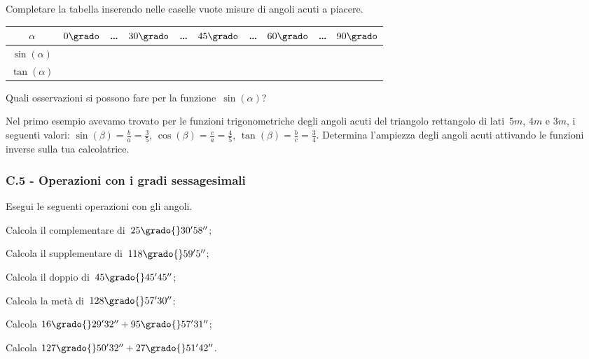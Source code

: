 \begin{esercizio}
\label{ese:C.4}
Completare la tabella inserendo nelle caselle vuote misure di angoli acuti a piacere.
\begin{center}
\begin{tabular}{cccccccccc}
\toprule
$\alpha$ & $0\grado$ & \ldots & $30\grado$ & \ldots & $45\grado$ & \ldots & $60\grado$ & \ldots & $90\grado$\\
\midrule
$\sin(\alpha)$ & & & & &  &  &  &  &  \\
$\tan(\alpha)$ & & &  &  &  &  &  &  &  \\
\bottomrule
\end{tabular}
\end{center}

Quali osservazioni si possono fare per la funzione~$\sin({\alpha})$?
\end{esercizio}

\begin{esercizio}
\label{ese:C.5}
Nel primo esempio avevamo trovato per le funzioni trigonometriche degli angoli acuti del triangolo rettangolo di lati~$5\unit{m}$,
$4\unit{m}$ e $3\unit{m}$, i seguenti valori:
$\sin(\beta)=\frac{b}{a}=\frac{3}{5}$, $\cos(\beta)=\frac{c}{a}=\frac{4}{5}$, $\tan(\beta)=\frac{b}{c}=\frac{3}{4}$.
Determina l'ampiezza degli angoli acuti attivando le funzioni inverse sulla tua calcolatrice.
\end{esercizio}

\subsubsection*{C.5 - Operazioni con i gradi sessagesimali}

\begin{esercizio}
\label{ese:C.6}
Esegui le seguenti operazioni con gli angoli.
\begin{multicols}{2}
\begin{enumeratea}
 \item Calcola il complementare di~$25\grado{}30' 58''$;
 \item Calcola il supplementare di~$118\grado{}59' 5''$;
 \item Calcola il doppio di~$45\grado{}45' 45''$;
 \item Calcola la metà di~$128\grado{}57' 30''$;
 \item Calcola $16\grado{}29' 32''+ 95\grado{}57' 31''$;
 \item Calcola $127\grado{}50' 32''+ 27\grado{}51' 42''$.
\end{enumeratea}
\end{multicols}
\end{esercizio}


